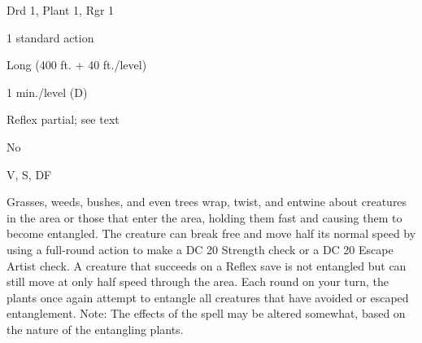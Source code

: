 
\begin{description*}
\item[Level:] Drd 1, Plant 1, Rgr 1
\item[Casting Time:] 1 standard action
\item[Range:] Long (400 ft. + 40 ft./level)
\item[Duration:] 1 min./level (D)
\item[Saving Throw:] Reflex partial; see text
\item[Spell Resistance:] No
\item[Components:] V, S, DF
\end{description*}

Grasses, weeds, bushes, and even trees wrap, twist, and entwine about creatures
in the area or those that enter the area, holding them fast and causing them to
become entangled. The creature can break free and move half its normal speed by
using a full-round action to make a DC 20 Strength check or a DC 20 Escape Artist
check. A creature that succeeds on a Reflex save is not entangled but can still
move at only half speed through the area. Each round on your turn, the plants once
again attempt to entangle all creatures that have avoided or escaped entanglement.
Note: The effects of the spell may be altered somewhat, based on the nature
of the entangling plants.